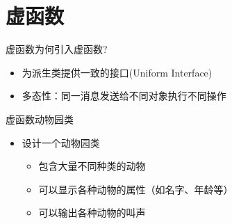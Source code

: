 \section[虚函数]{虚函数}\label{sec:chap06-sec01}
\begin{frame}[t, fragile]{虚函数}{为何引入虚函数?}%
  \stretchon
  \begin{itemize}
  \item 为派生类提供一致的接口(Uniform Interface)
  \item \alert{多态性}：同一消息发送给不同对象执行不同操作
  \end{itemize}
  \stretchoff
\end{frame}

\begin{frame}[t, fragile]{虚函数}{动物园类}%
  \stretchon
  \begin{itemize}
  \item 设计一个动物园类
    \begin{itemize}
    \item 包含大量不同种类的动物
    \item 可以显示各种动物的属性（如名字、年龄等）
    \item 可以输出各种动物的叫声
    \end{itemize}
  \end{itemize}
  \stretchoff
\end{frame}

